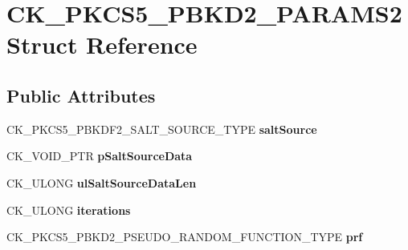 \hypertarget{struct_c_k___p_k_c_s5___p_b_k_d2___p_a_r_a_m_s2}{}\section{C\+K\+\_\+\+P\+K\+C\+S5\+\_\+\+P\+B\+K\+D2\+\_\+\+P\+A\+R\+A\+M\+S2 Struct Reference}
\label{struct_c_k___p_k_c_s5___p_b_k_d2___p_a_r_a_m_s2}
\subsection*{Public Attributes}
\begin{DoxyCompactItemize}
\item 
\mbox{\label{struct_c_k___p_k_c_s5___p_b_k_d2___p_a_r_a_m_s2_a609184a194042c0ce2f996430e9e6d96}} 
C\+K\+\_\+\+P\+K\+C\+S5\+\_\+\+P\+B\+K\+D\+F2\+\_\+\+S\+A\+L\+T\+\_\+\+S\+O\+U\+R\+C\+E\+\_\+\+T\+Y\+PE {\bfseries salt\+Source}
\item 
\mbox{\label{struct_c_k___p_k_c_s5___p_b_k_d2___p_a_r_a_m_s2_ab027965cdb4ba050b3f165b98858d27d}} 
C\+K\+\_\+\+V\+O\+I\+D\+\_\+\+P\+TR {\bfseries p\+Salt\+Source\+Data}
\item 
\mbox{\label{struct_c_k___p_k_c_s5___p_b_k_d2___p_a_r_a_m_s2_ab2344888d3c02e0a8dcd546ad318160a}} 
C\+K\+\_\+\+U\+L\+O\+NG {\bfseries ul\+Salt\+Source\+Data\+Len}
\item 
\mbox{\label{struct_c_k___p_k_c_s5___p_b_k_d2___p_a_r_a_m_s2_ae006131e1f269ff0a5e27f53b92dbf38}} 
C\+K\+\_\+\+U\+L\+O\+NG {\bfseries iterations}
\item 
\mbox{\label{struct_c_k___p_k_c_s5___p_b_k_d2___p_a_r_a_m_s2_a9aa425b215b3b25f43fed62517571823}} 
C\+K\+\_\+\+P\+K\+C\+S5\+\_\+\+P\+B\+K\+D2\+\_\+\+P\+S\+E\+U\+D\+O\+\_\+\+R\+A\+N\+D\+O\+M\+\_\+\+F\+U\+N\+C\+T\+I\+O\+N\+\_\+\+T\+Y\+PE {\bfseries prf}
\item 
\mbox{\label{struct_c_k___p_k_c_s5___p_b_k_d2___p_a_r_a_m_s2_a5dd0e956ffe672623b4d2262318ee68f}} 

\end{DoxyCompactItemize}
